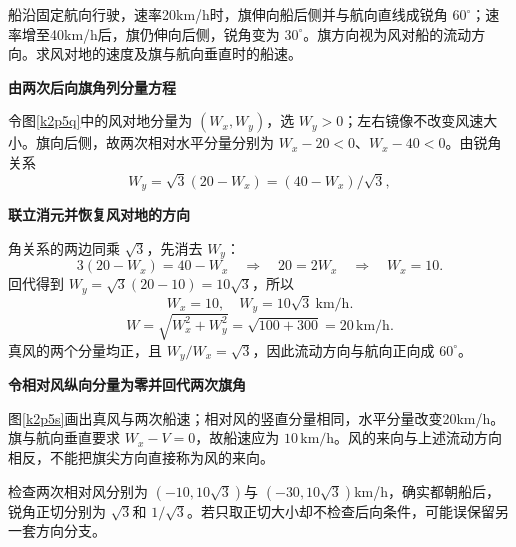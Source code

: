 \begin{question}\begin{example}[两次旗向反求风速]\label{k2p5}
船沿固定航向行驶，速率20km/h时，旗伸向船后侧并与航向直线成锐角 $60^\circ$；速率增至40km/h后，旗仍伸向后侧，锐角变为 $30^\circ$。旗方向视为风对船的流动方向。求风对地的速度及旗与航向垂直时的船速。\end{example}
\end{question}
\begin{solution}\textbf{由两次后向旗角列分量方程}\par\nobreak
令图\ref{k2p5q}中的风对地分量为 $(W_x,W_y)$，选 $W_y>0$；左右镜像不改变风速大小。旗向后侧，故两次相对水平分量分别为 $W_x-20<0$、$W_x-40<0$。由锐角关系
\[W_y=\sqrt3(20-W_x)=(40-W_x)/\sqrt3,\]


\par\medskip{}\noindent\textbf{联立消元并恢复风对地的方向}\par\nobreak
角关系的两边同乘 $\sqrt3$，先消去 $W_y$：
\[
 3(20-W_x)=40-W_x
 \quad\Longrightarrow\quad 20=2W_x
 \quad\Longrightarrow\quad W_x=10.
\]
回代得到 $W_y=\sqrt3(20-10)=10\sqrt3$，所以
\[\boxed{W_x=10,\quad W_y=10\sqrt3\ \mathrm{km/h}}.\]
\[W=\sqrt{W_x^2+W_y^2}=\sqrt{100+300}=\boxed{20\,\mathrm{km/h}}.\]
真风的两个分量均正，且 $W_y/W_x=\sqrt3$，因此流动方向与航向正向成 $60^\circ$。



\par\medskip{}\noindent\textbf{令相对风纵向分量为零并回代两次旗角}\par\nobreak
图\ref{k2p5s}画出真风与两次船速；相对风的竖直分量相同，水平分量改变20km/h。旗与航向垂直要求 $W_x-V=0$，故船速应为 $\boxed{10\,\mathrm{km/h}}$。风的来向与上述流动方向相反，不能把旗尖方向直接称为风的来向。

检查两次相对风分别为 $(-10,10\sqrt3)$与 $(-30,10\sqrt3)$km/h，确实都朝船后，锐角正切分别为 $\sqrt3$和 $1/\sqrt3$。若只取正切大小却不检查后向条件，可能误保留另一套方向分支。\end{solution}

